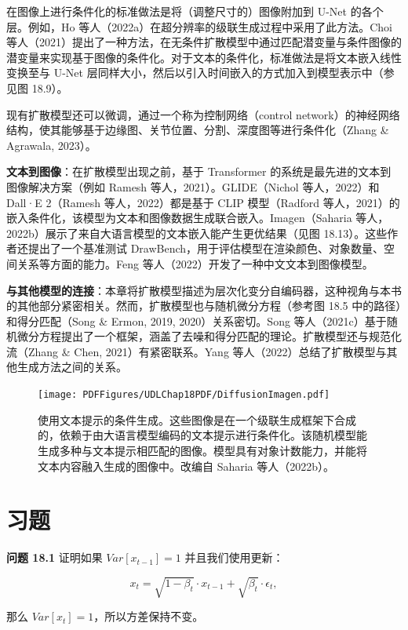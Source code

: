 \documentclass[lang=cn,newtx,10pt,scheme=chinese]{elegantbook}
\begin{document}
在图像上进行条件化的标准做法是将（调整尺寸的）图像附加到 U-Net 的各个层。例如，Ho 等人（2022a）在超分辨率的级联生成过程中采用了此方法。Choi 等人（2021）提出了一种方法，在无条件扩散模型中通过匹配潜变量与条件图像的潜变量来实现基于图像的条件化。对于文本的条件化，标准做法是将文本嵌入线性变换至与 U-Net 层同样大小，然后以引入时间嵌入的方式加入到模型表示中（参见图 18.9）。

现有扩散模型还可以微调，通过一个称为控制网络（control network）的神经网络结构，使其能够基于边缘图、关节位置、分割、深度图等进行条件化（Zhang \& Agrawala, 2023）。

\textbf{文本到图像}：在扩散模型出现之前，基于 Transformer 的系统是最先进的文本到图像解决方案（例如 Ramesh 等人，2021）。GLIDE（Nichol 等人，2022）和 Dall·E 2（Ramesh 等人，2022）都是基于 CLIP 模型（Radford 等人，2021）的嵌入条件化，该模型为文本和图像数据生成联合嵌入。Imagen（Saharia 等人，2022b）展示了来自大语言模型的文本嵌入能产生更优结果（见图 18.13）。这些作者还提出了一个基准测试 DrawBench，用于评估模型在渲染颜色、对象数量、空间关系等方面的能力。Feng 等人（2022）开发了一种中文文本到图像模型。

\textbf{与其他模型的连接}：本章将扩散模型描述为层次化变分自编码器，这种视角与本书的其他部分紧密相关。然而，扩散模型也与随机微分方程（参考图 18.5 中的路径）和得分匹配（Song \& Ermon, 2019, 2020）关系密切。Song 等人（2021c）基于随机微分方程提出了一个框架，涵盖了去噪和得分匹配的理论。扩散模型还与规范化流（Zhang \& Chen, 2021）有紧密联系。Yang 等人（2022）总结了扩散模型与其他生成方法之间的关系。


\begin{figure}[ht!]
\centering
\texttt{[image: PDFFigures/UDLChap18PDF/DiffusionImagen.pdf]}
\caption{使用文本提示的条件生成。这些图像是在一个级联生成框架下合成的，依赖于由大语言模型编码的文本提示进行条件化。该随机模型能生成多种与文本提示相匹配的图像。模型具有对象计数能力，并能将文本内容融入生成的图像中。改编自 Saharia 等人（2022b）。}
\end{figure}


\section{习题}
\textbf{问题 18.1} 证明如果 \(Var[x_{t-1}] = 1\) 并且我们使用更新：

\begin{equation}
x_t = \sqrt{1 - \beta_t} \cdot x_{t-1} + \sqrt{\beta_t} \cdot \epsilon_t, 
\end{equation}

那么 \(Var[x_t] = 1\)，所以方差保持不变。
\end{document}
